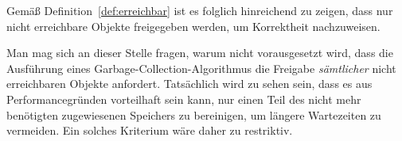 Gemäß Definition~\ref{def:erreichbar} ist es folglich hinreichend zu zeigen, dass nur nicht erreichbare Objekte freigegeben werden, um Korrektheit nachzuweisen.

Man mag sich an dieser Stelle fragen, warum nicht vorausgesetzt wird, dass die Ausführung eines Garbage-Collection-Algorithmus die Freigabe \textit{sämtlicher} nicht erreichbaren Objekte anfordert.
Tatsächlich wird zu sehen sein, dass es aus Performancegründen vorteilhaft sein kann, nur einen Teil des nicht mehr benötigten zugewiesenen Speichers zu bereinigen, um längere Wartezeiten zu vermeiden.
Ein solches Kriterium wäre daher zu restriktiv.